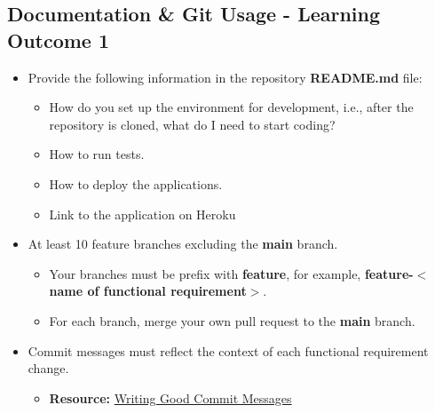 \documentclass{article}
\begin{document}
\subsection*{Documentation \& Git Usage - Learning Outcome 1}
\begin{itemize}
    \item Provide the following information in the repository \textbf{README.md} file:
    \begin{itemize}
		\item How do you set up the environment for development, i.e., after the repository is cloned, what do I need to start coding?
		\item How to run tests.
		\item How to deploy the applications.
		\item Link to the application on Heroku
    \end{itemize}
    \item At least 10 feature branches excluding the \textbf{main} branch.
    \begin{itemize}
        \item Your branches must be prefix with \textbf{feature}, for example, \textbf{feature-$<$name of functional requirement$>$}.
        \item For each branch, merge your own pull request to the \textbf{main} branch.
    \end{itemize}
    \item Commit messages must reflect the context of each functional requirement change.
    \begin{itemize}
		\item \textbf{Resource:} \href{https://www.freecodecamp.org/news/writing-good-commit-messages-a-practical-guide}{Writing Good Commit Messages}
	\end{itemize}
\end{itemize}
\end{document}
